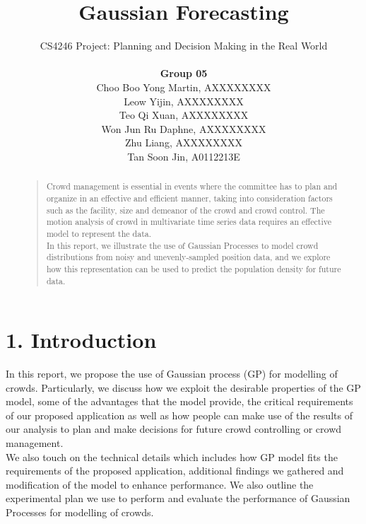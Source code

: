 \documentclass[letterpaper]{article}
\begin{document}
%
\title{Gaussian Forecasting}
\author{CS4246 Project: Planning and Decision Making in the Real World  \\ \\
{\bf Group 05} \\
Choo Boo Yong Martin, AXXXXXXXX\\
Leow Yijin, AXXXXXXXX\\
Teo Qi Xuan, AXXXXXXXX\\
Won Jun Ru Daphne, AXXXXXXXX\\
Zhu Liang, AXXXXXXXX\\
Tan Soon Jin, A0112213E\\
}
\maketitle
\begin{abstract}
\begin{quote}
Crowd management is essential in events where the committee has to plan and organize in an effective and efficient manner, taking into consideration factors such as the facility, size and demeanor of the crowd and crowd control. The motion analysis of crowd in multivariate time series data requires an effective model to represent the data.\\
In this report, we illustrate the use of Gaussian Processes to model crowd distributions from noisy and unevenly-sampled position data, and we explore how this representation can be used to predict the population density for future data.
\end{quote}
\end{abstract}

\section{1.  Introduction}
In this report, we propose the use of Gaussian process (GP) for modelling of crowds. Particularly, we discuss how we exploit the desirable properties of the GP model, some of the advantages that the model provide, the critical requirements of our proposed application as well as how people can make use of the results of our analysis to plan and make decisions for future crowd controlling or crowd management. \\

We also touch on the technical details which includes how GP model fits the requirements of the proposed application, additional findings we gathered and modification of the model to enhance performance. We also outline the experimental plan we use to perform and evaluate the performance of Gaussian Processes for modelling of crowds. \\
\end{document}
